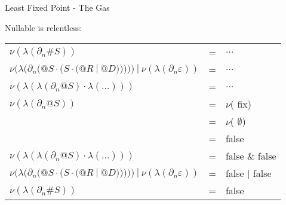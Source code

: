 \documentclass[10pt]{beamer}
\begin{document}
\begin{frame}{Least Fixed Point - The Gas}


Nullable is relentless:

\begin{center}
\begin{tabular}{lll}
$\nu(\lambda(\partial_n \#S))$ &=& $\ldots$\\
$\nu(\lambda(\partial_n(@S \cdot (S \cdot ( @R\ |\ @D )))))\ |\ \nu(\lambda(\partial_n \varepsilon))$ &=& $\ldots$ \\
$\nu(\lambda(\lambda(\partial_n @S) \cdot \lambda(\ldots)))$& = & $\ldots$ \\
$\nu(\lambda(\partial_n @S))$   &=& $\nu$({\color{mLightGreen} fix}) \\
                                &=& $\nu$({\color{mLightGreen} $\emptyset$}) \\
                                &=& {\color{mLightGreen} false} \\
$\nu(\lambda(\lambda(\partial_n @S) \cdot \lambda(\ldots)))$& = & {\color{mLightGreen} false} \& false \\
$\nu(\lambda(\partial_n(@S \cdot (S \cdot ( @R\ |\ @D )))))\ |\ \nu(\lambda(\partial_n \varepsilon))$ &=& {\color{mLightGreen} false} | false\\
$\nu(\lambda(\partial_n \#S))$ &=& {\color{mLightGreen} false} \\
\end{tabular}
\end{center}
\end{frame}


\end{document}

